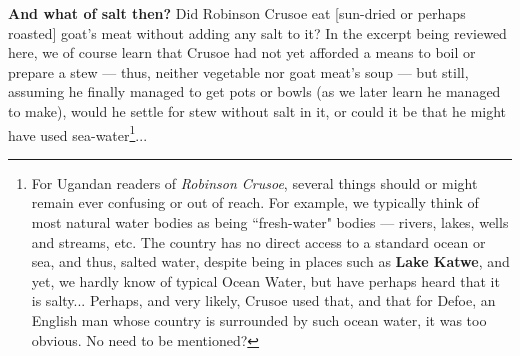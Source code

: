 \documentclass[a4paper]{article}
\begin{document}
\textbf{And what of salt then?} Did Robinson Crusoe eat [sun-dried or perhaps roasted] goat's meat without adding any salt to it? In the excerpt being reviewed here, we of course learn that Crusoe had not yet afforded a means to boil or prepare a stew --- thus, neither vegetable nor goat meat's soup --- but still, assuming he finally managed to get pots or bowls (as we later learn he managed to make), would he settle for stew without salt in it, or could it be that he might have used sea-water\footnote{For Ugandan readers of \textit{Robinson Crusoe}, several things should or might remain ever confusing or out of reach. For example, we typically think of most natural water bodies as being ``fresh-water" bodies --- rivers, lakes, wells and streams, etc. The country has no direct access to a standard ocean or sea, and thus, salted water, despite being in places such as \textbf{Lake Katwe}, and yet, we hardly know of typical Ocean Water, but have perhaps heard that it is salty... Perhaps, and very likely, Crusoe used that, and that for Defoe, an English man whose country is surrounded by such ocean water, it was too obvious. No need to be mentioned?}... 
\end{document}
